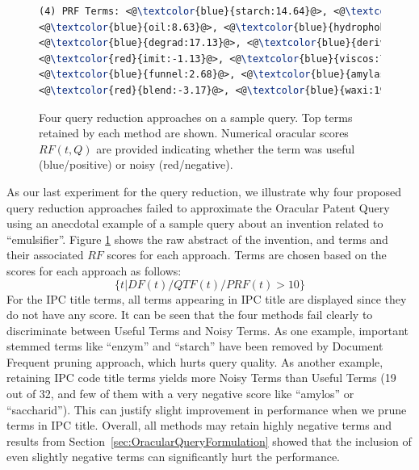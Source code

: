 \begin{figure}[htpb]
\begin{framed}
\begin{lstlisting}[basicstyle=\small\ttfamily , linewidth=\columnwidth,breaklines=true, language=TeX]
(4) PRF Terms: <@\textcolor{blue}{starch:14.64}@>, <@\textcolor{blue}{encapsul:17.50}@>, <@\textcolor{red}{chees:-4.22}@>, 
<@\textcolor{blue}{oil:8.63}@>, <@\textcolor{blue}{hydrophob:5.45}@>, <@\textcolor{blue}{agent:5.19}@>, <@\textcolor{red}{casein:-2.19}@>, 
<@\textcolor{blue}{degrad:17.13}@>, <@\textcolor{blue}{deriv:11.97}@>, <@\textcolor{blue}{tablet:5.30}@>, <@\textcolor{red}{debranch:-10.58}@>, 
<@\textcolor{red}{imit:-1.13}@>, <@\textcolor{blue}{viscos:7.77}@>, <@\textcolor{blue}{oxid:5.97}@>, <@\textcolor{blue}{activ:5.98}@>, <@\textcolor{blue}{osa:9.32}@>, 
<@\textcolor{blue}{funnel:2.68}@>, <@\textcolor{blue}{amylas:26.06}@>, <@\textcolor{red}{amylopectin:-7.14}@>, <@\textcolor{blue}{maiz:20.61}@>, 
<@\textcolor{red}{blend:-3.17}@>, <@\textcolor{blue}{waxi:19.41}@>, <@\textcolor{blue}{convert:31.81}@>, 

 \end{lstlisting} 
 \vspace*{-2ex}
\end{framed}
 \vspace*{-2ex}
  \caption{Four query reduction approaches on a sample query.  Top
    terms retained by each method are shown.  Numerical oracular
    scores $\mathit{RF}(t,Q)$ are provided indicating whether the term
    was useful (blue/positive) or noisy (red/negative).}
  \label{fig:anecdotal}  
\end{figure}
\FloatBarrier
As our last experiment for the query reduction, we illustrate why four proposed query reduction approaches failed to approximate the Oracular Patent Query using an anecdotal example of a sample query about an invention related to ``emulsifier''. 
Figure \ref{fig:anecdotal} shows the raw abstract of the invention, and terms and their associated $\mathit{RF}$ scores for each approach. 
Terms are chosen based on the scores for each approach as follows: 
\begin{displaymath}\{t| DF(t)/QTF(t)/PRF(t)>10\}\end{displaymath}
For the IPC title terms, all terms appearing in IPC title are displayed since they do not have any score.   
It can be seen that the four methods fail clearly to discriminate between Useful Terms and Noisy Terms. As one example, important stemmed terms like ``enzym'' and ``starch'' have been removed by Document Frequent pruning approach, which hurts query quality.  As another example, retaining IPC code title terms yields more Noisy Terms than Useful Terms (19 out of 32, and few of them with a very negative score like ``amylos'' or ``saccharid''). This can justify slight improvement in performance when we prune terms in IPC title. Overall, all methods may retain highly negative terms and results from Section~\ref{sec:OracularQueryFormulation} showed that the inclusion of even slightly negative terms can significantly hurt the performance.
